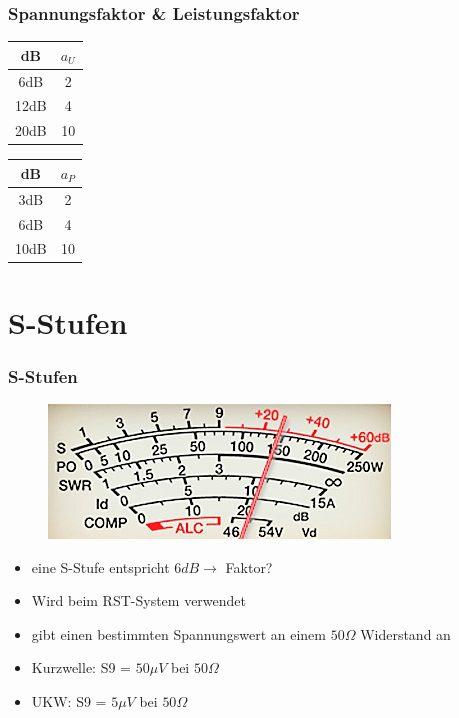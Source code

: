 \begin{frame}
\frametitle{Spannungsfaktor \& Leistungsfaktor}
\begin{center}
\begin{Huge}
\begin{minipage}{0.3\textwidth}
	\begin{tabular}{|c|c|}
		\hline
		\textbf{dB} & $a_{U}$ \\
		\hline \hline
		\alert{6dB}  & \alert{2}  \\ \hline
		12dB & 4  \\ \hline
		\alert{20dB} & \alert{10} \\ \hline
	\end{tabular}
\end{minipage}
\hspace{2cm}
\begin{minipage}{0.3\textwidth}
	\begin{tabular}{|c|c|}
		\hline
		\textbf{dB} & $a_{P}$ \\
		\hline \hline
		\alert{3dB}  & \alert{2}  \\ \hline
		6dB  & 4  \\ \hline
		\alert{10dB} & \alert{10} \\ \hline
	\end{tabular}
\end{minipage}
\end{Huge}
\end{center}
\end{frame}

\section*{S-Stufen}
\begin{frame}
\frametitle{S-Stufen}
\begin{center}
\begin{figure}
\includegraphics[scale=1.2]{e10/S-Meter.jpg}
\end{figure}
\begin{itemize}
	\item eine S-Stufe entspricht $6 dB \rightarrow$ Faktor?
	\item Wird beim RST-System verwendet
	\item gibt einen bestimmten Spannungswert an einem $50\Omega$ Widerstand an
	\item Kurzwelle: S9 = $50\mu V$ bei $50\Omega$
	\item UKW: S9 = $5\mu V$ bei $50\Omega$
\end{itemize}
\end{center}
\end{frame}


